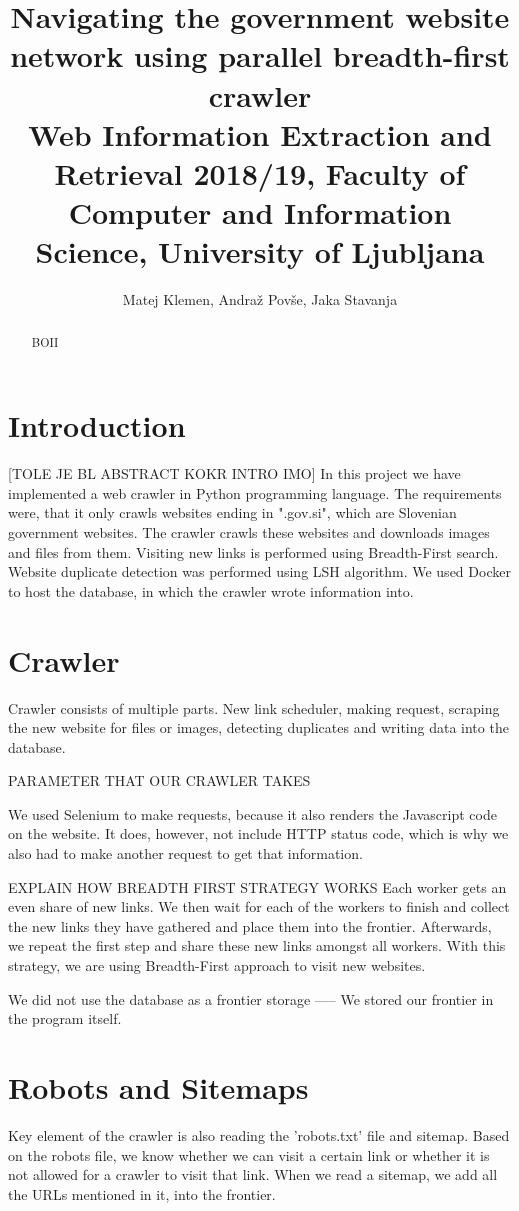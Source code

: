 \documentclass[9pt]{IEEEtran}
\title{\vspace{0ex} %
Navigating the government website network using parallel breadth-first crawler
\\ \normalsize{Web Information Extraction and Retrieval 2018/19, Faculty of Computer and Information Science, University of Ljubljana}}
\author{ %
Matej Klemen, Andraž Povše, Jaka Stavanja
\vspace{-4.0ex}
}
\begin{document}
\maketitle

\begin{abstract}
BOII
\end{abstract}

\section{Introduction}
[TOLE JE BL ABSTRACT KOKR INTRO IMO]
In this project we have implemented a web crawler in Python programming language. The requirements were, that it only crawls websites ending in ".gov.si", which are Slovenian government websites. The crawler crawls these websites and downloads images and files from them. Visiting new links is performed using Breadth-First search. Website duplicate detection was performed using LSH algorithm. We used Docker to host the database, in which the crawler wrote information into. 
\section{Crawler}
Crawler consists of multiple parts. New link scheduler, making request, scraping the new website for files or images, detecting duplicates and writing data into the database.

PARAMETER THAT OUR CRAWLER TAKES

We used Selenium to make requests, because it also renders the Javascript code on the website. It does, however, not include HTTP status code, which is why we also had to make another request to get that information.


EXPLAIN HOW BREADTH FIRST STRATEGY WORKS
Each worker gets an even share of new links. We then wait for each of the workers to finish and collect the new links they have gathered and place them into the frontier. Afterwards, we repeat the first step and share these new links amongst all workers. With this strategy, we are using Breadth-First approach to visit new websites.


We did not use the database as a frontier storage ----- We stored our frontier in the program itself.

\section{Robots and Sitemaps}
Key element of the crawler is also reading the 'robots.txt' file and sitemap. Based on the robots file, we know whether we can visit a certain link or whether it is not allowed for a crawler to visit that link.
When we read a sitemap, we add all the URLs mentioned in it, into the frontier. 
\end{document}
